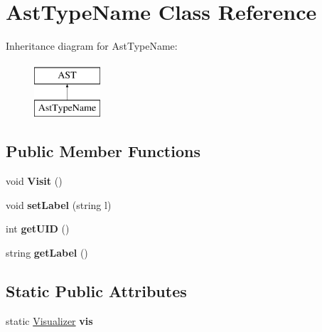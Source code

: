 \hypertarget{classAstTypeName}{\section{Ast\-Type\-Name Class Reference}
\label{classAstTypeName}
}
Inheritance diagram for Ast\-Type\-Name\-:\begin{figure}[H]
\begin{center}
\leavevmode
\includegraphics[height=2.000000cm]{classAstTypeName}
\end{center}
\end{figure}
\subsection*{Public Member Functions}
\begin{DoxyCompactItemize}
\item 
\hypertarget{classAstTypeName_adcd2b22b4135cadd7b9117e25a5dff45}{void {\bfseries Visit} ()}\label{classAstTypeName_adcd2b22b4135cadd7b9117e25a5dff45}

\item 
\hypertarget{classAST_a71d680856e95ff89f55d5311a552eba6}{void {\bfseries set\-Label} (string l)}\label{classAST_a71d680856e95ff89f55d5311a552eba6}

\item 
\hypertarget{classAST_ab7a5b1d9f1c2de0d98deb356f724a42c}{int {\bfseries get\-U\-I\-D} ()}\label{classAST_ab7a5b1d9f1c2de0d98deb356f724a42c}

\item 
\hypertarget{classAST_aee029be902fffc927d16ccb03eb922ad}{string {\bfseries get\-Label} ()}\label{classAST_aee029be902fffc927d16ccb03eb922ad}

\end{DoxyCompactItemize}
\subsection*{Static Public Attributes}
\begin{DoxyCompactItemize}
\item 
\hypertarget{classAST_aca9e6637209b31e03a09c0d42f29bdfa}{static \hyperlink{classVisualizer}{Visualizer} {\bfseries vis}}\label{classAST_aca9e6637209b31e03a09c0d42f29bdfa}

\end{DoxyCompactItemize}
